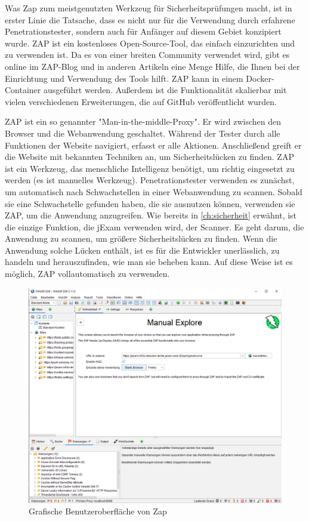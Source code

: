 Was Zap zum meistgenutzten Werkzeug für Sicherheitsprüfungen macht,
ist in erster Linie die Tatsache, dass es nicht nur für die Verwendung
durch erfahrene Penetrationstester, sondern auch für Anfänger auf diesem
Gebiet konzipiert wurde. ZAP ist ein kostenloses Open-Source-Tool, das
einfach einzurichten und zu verwenden ist. Da es von einer breiten Community
verwendet wird, gibt es online im ZAP-Blog und in anderen Artikeln eine Menge
Hilfe, die Ihnen bei der Einrichtung und Verwendung des Tools hilft.
ZAP kann in einem Docker-Container ausgeführt werden. Außerdem ist die
Funktionalität skalierbar mit vielen verschiedenen Erweiterungen, die
auf GitHub veröffentlicht wurden.


ZAP ist ein so genannter "Man-in-the-middle-Proxy". Er wird zwischen den
Browser und die Webanwendung geschaltet. Während der Tester durch alle
Funktionen der Website navigiert, erfasst er alle Aktionen. Anschließend
greift er die Website mit bekannten Techniken an, um Sicherheitslücken zu
finden.  ZAP ist ein Werkzeug, das menschliche Intelligenz benötigt,
um richtig eingesetzt zu werden (es ist manuelles Werkzeug).
Penetrationstester verwenden es zunächst, um automatisch nach Schwachstellen
in einer Webanwendung zu scannen. Sobald sie eine Schwachstelle gefunden
haben, die sie ausnutzen können, verwenden sie ZAP, um die Anwendung
anzugreifen. Wie bereits in \autoref{ch:sicherheit} erwähnt, ist die einzige Funktion,
die jExam verwenden wird, der Scanner. Es geht darum, die Anwendung zu
scannen, um größere Sicherheitslücken zu finden.  Wenn die Anwendung solche
Lücken enthält, ist es für die Entwickler unerlässlich, zu handeln und
herauszufinden, wie man sie beheben kann. Auf diese Weise ist es möglich,
ZAP vollautomatisch zu verwenden.


\begin{figure}[H]
    \centering
    \includegraphics[scale=0.5]{images/zap-interface}
    \caption{Grafische Benutzeroberfläche von Zap} \label{fig:zap-interface}
\end{figure}


